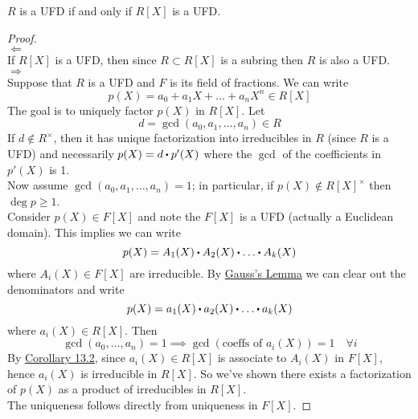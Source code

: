 \documentclass[../Main.tex]{subfiles}
\begin{document}
\begin{thm}[title = \texorpdfstring{$R$ UFD $\Longleftrightarrow R[X]$ UFD}{R UFD iff R[X] UFD}]
	$R$ is a UFD if and only if $R[X]$ is a UFD.
\end{thm}
\begin{proof}~\\
	$\Leftarrow$\\
	If $R[X]$ is a UFD, then since $R\subset R[X]$ is a subring then $R$ is also a UFD.\\
	$\Rightarrow$\\
	Suppose that $R$ is a UFD and $F$ is its field of fractions. We can write
	\[p(X) =a_0+a_1X+\dots+a_nX^n\in R[X]\]
	The goal is to uniquely factor $p(X)$ in $R[X]$. Let
	\[d=\gcd(a_0,a_1,\dots,a_n)\in R\]
	If $d\notin R^\times$, then it has unique factorization into irreducibles in $R$ (since $R$ is a UFD) and necessarily $p(X) = d\rdot p'(X)$ where the $\gcd$ of the coefficients in $p'(X)$ is 1. \\
	Now assume $\gcd(a_0,a_1,\dots,a_n)=1$; in particular, if $p(X)\notin R[X]^\times$ then $\deg p\ge 1$.\\
	Consider $p(X)\in F[X]$ and note the $F[X]$ is a UFD (actually a Euclidean domain). This implies we can write
	\[p(X)=A_1(X)\rdot A_2(X)\rdot \dots \rdot A_k(X)\]
	where $A_i(X)\in F[X]$ are irreducible. By \hyperref[lem:gauss]{Gauss's Lemma} we can clear out the denominators and write
	\[p(X)=a_1(X)\rdot a_2(X)\rdot \dots \rdot a_k(X)\]
	where $a_i(X)\in R[X]$. Then
	\[\gcd(a_0,\dots,a_n)=1 \implies \gcd(\text{coeffs of }a_i(X))=1\quad \forall i\]
	By \hyperref[co:13.2]{Corollary 13.2}, since $a_i(X)\in R[X]$ is associate to $A_i(X)$ in $F[X]$, hence $a_i(X)$ is irreducible in $R[X]$. So we've shown there exists a factorization of $p(X)$ as a product of irreducibles in $R[X]$.\\
	The uniqueness follows directly from uniqueness in $F[X]$.
\end{proof}
\end{document}
